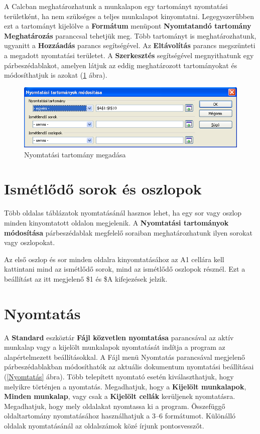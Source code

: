 A Calcban meghatározhatunk a munkalapon egy tartományt nyomtatási
területként, ha nem szükséges a teljes munkalapot kinyomtatni.
Legegyszerűbben ezt a tartományt kijelölve a
\textbf{Formátum} menüpont \textbf{Nyomtatandó tartomány}
\textbf{Meghatározás} paranccsal tehetjük meg. Több
tartományt is meghatározhatunk, ugyanitt a \textbf{Hozzáadás}
parancs segítségével. Az \textbf{Eltávolítás} parancs
megszünteti a megadott nyomtatási területet. A
\textbf{Szerkesztés} segítségével megnyithatunk egy
párbeszédablakot, amelyen látjuk az eddig meghatározott
tartományokat és módosíthatjuk is azokat (\ref{NyomtatásiTartomány} ábra).

\begin{figure}[!h]
\begin{center}
\includegraphics[width=14.999cm]{oocalcv2-img168.png}
\caption{Nyomtatási tartomány megadása}\label{NyomtatásiTartomány}
\end{center}
\end{figure}


\section{Ismétlődő sorok és oszlopok}

Több oldalas táblázatok nyomtatásánál hasznos lehet, ha egy
sor vagy oszlop minden kinyomtatott oldalon megjelenik. A
\textbf{Nyomtatási tartományok módosítása} párbeszédablak
megfelelő soraiban  meghatározhatunk ilyen sorokat vagy
oszlopokat.

Az első oszlop és sor minden oldalra kinyomtatásához az A1
cellára kell kattintani mind az ismétlődő sorok, mind az
ismétlődő oszlopok résznél. Ezt a beállítást az itt
megjelenő \$1 és \$A kifejezések jelzik.


\section{Nyomtatás}

A \textbf{Standard} eszköztár \textbf{Fájl közvetlen
nyomtatása} parancsával az aktív munkalap vagy a kijelölt
munkalapok nyomtatását indítja a program az alapértelmezett
beállításokkal. A Fájl menü Nyomtatás parancsával
megjelenő párbeszédablakban módosíthatók az aktuális
dokumentum nyomtatási beállításai (\ref{Nyomtatás} ábra). Több
telepített nyomtató esetén kiválaszthatjuk, hogy melyikre
történjen a nyomtatás. Megadhatjuk, hogy a \textbf{Kijelölt
munkalapok}, \textbf{Minden munkalap}, vagy csak a \textbf{Kijelölt
cellák} kerüljenek nyomtatásra. Megadhatjuk, hogy mely oldalakat
nyomtassa ki a program. Összefüggő oldaltartomány
nyomtatásához használhatjuk a 3--6 formátumot. Különálló
oldalak nyomtatásánál az oldalszámok közé írjunk
pontosvesszőt.

